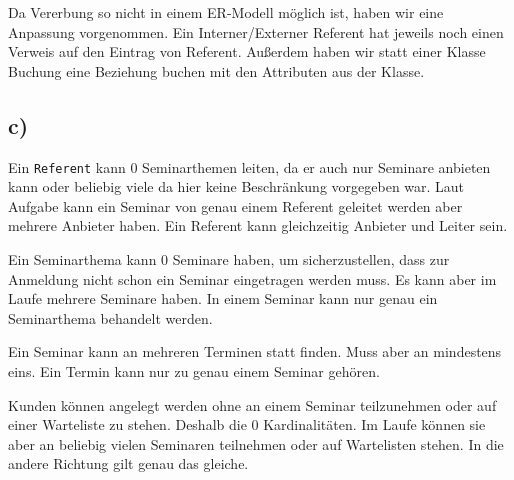 \documentclass[10pt,a4paper]{article}
\begin{document}
Da Vererbung so nicht in einem ER-Modell möglich ist, haben wir eine Anpassung vorgenommen. Ein Interner/Externer Referent hat jeweils noch einen Verweis auf den Eintrag von Referent.
Außerdem haben wir statt einer Klasse Buchung eine Beziehung buchen mit den Attributen aus der Klasse.

\subsection{c)}

Ein \texttt{Referent} kann 0 Seminarthemen leiten, da er auch nur Seminare anbieten kann oder beliebig viele da hier keine Beschränkung vorgegeben war. 
Laut Aufgabe kann ein Seminar von genau einem Referent geleitet werden aber mehrere Anbieter haben. Ein Referent kann gleichzeitig Anbieter und Leiter sein.

Ein Seminarthema kann 0 Seminare haben, um sicherzustellen, dass zur Anmeldung nicht schon ein Seminar eingetragen werden muss. Es kann aber im Laufe mehrere Seminare haben.
In einem Seminar kann nur genau ein Seminarthema behandelt werden.

Ein Seminar kann an mehreren Terminen statt finden. Muss aber an mindestens eins. Ein Termin kann nur zu genau einem Seminar gehören.

Kunden können angelegt werden ohne an einem Seminar teilzunehmen oder auf einer Warteliste zu stehen. Deshalb die 0 Kardinalitäten. Im Laufe können sie aber an beliebig vielen Seminaren teilnehmen oder auf Wartelisten stehen. In die andere Richtung gilt genau das gleiche.
\end{document}
